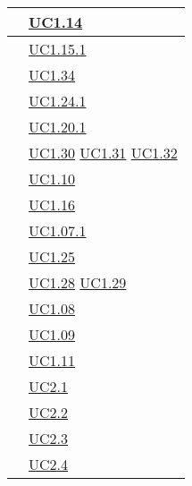 \begin{longtable}{|P{6cm}|P{6cm}|}
	\hline {} & \hyperref[UC1.14]{UC1.14} \\
	\hline {} & \hyperref[UC1.15.1]{UC1.15.1} \\
	\hline {} & \hyperref[UC1.34]{UC1.34} \\
	\hline {} & \hyperref[UC1.24.1]{UC1.24.1} \\
	\hline {} & \hyperref[UC1.20.1]{UC1.20.1} \\	
	\hline {} & \hyperref[UC1.30]{UC1.30} \linebreak \hyperref[UC1.31]{UC1.31} \linebreak \hyperref[UC1.32]{UC1.32} \\
	\hline {} & \hyperref[UC1.10]{UC1.10} \\
	\hline {} & \hyperref[UC1.16]{UC1.16} \\
	\hline {} & \hyperref[UC1.07.1]{UC1.07.1} \\
	\hline {} & \hyperref[UC1.25]{UC1.25} \\
	\hline {} & \hyperref[UC1.28]{UC1.28} \linebreak \hyperref[UC1.29]{UC1.29}  \\	 
	\hline {} & \hyperref[UC1.08]{UC1.08} \\
	\hline {} & \hyperref[UC1.09]{UC1.09} \\
	\hline {} & \hyperref[UC1.11]{UC1.11} \\	
	\hline {} & \hyperref[UC2.1]{UC2.1} \\
	\hline {} & \hyperref[UC2.2]{UC2.2} \\
	\hline {} & \hyperref[UC2.3]{UC2.3} \\
	\hline {} & \hyperref[UC2.4]{UC2.4} \\	

\end{longtable}
